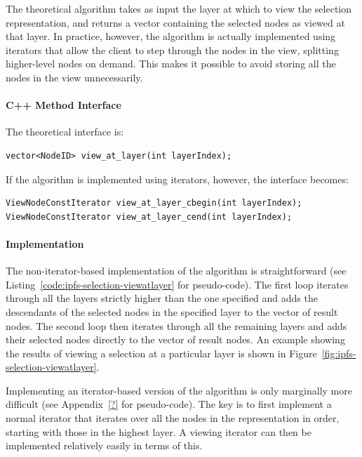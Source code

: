 The theoretical algorithm takes as input the layer at which to view the selection representation, and returns a vector containing the selected nodes as viewed at that layer. In practice, however, the algorithm is actually implemented using iterators that allow the client to step through the nodes in the view, splitting higher-level nodes on demand. This makes it possible to avoid storing all the nodes in the view unnecessarily.

\paragraph{C++ Method Interface}

The theoretical interface is:

\begin{lstlisting}[style=Prototype]
vector<NodeID> view_at_layer(int layerIndex);
\end{lstlisting}

\noindent If the algorithm is implemented using iterators, however, the interface becomes:

\begin{lstlisting}[style=Prototype]
ViewNodeConstIterator view_at_layer_cbegin(int layerIndex);
ViewNodeConstIterator view_at_layer_cend(int layerIndex);
\end{lstlisting}

\paragraph{Implementation}

The non-iterator-based implementation of the algorithm is straightforward (see Listing~\ref{code:ipfs-selection-viewatlayer} for pseudo-code). The first loop iterates through all the layers strictly higher than the one specified and adds the descendants of the selected nodes in the specified layer to the vector of result nodes. The second loop then iterates through all the remaining layers and adds their selected nodes directly to the vector of result nodes. An example showing the results of viewing a selection at a particular layer is shown in Figure~\ref{fig:ipfs-selection-viewatlayer}.

Implementing an iterator-based version of the algorithm is only marginally more difficult (see Appendix~\ref{?} for pseudo-code). The key is to first implement a normal iterator that iterates over all the nodes in the representation in order, starting with those in the highest layer. A viewing iterator can then be implemented relatively easily in terms of this.

